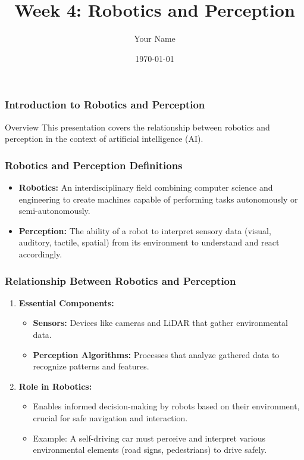 \documentclass{beamer}
\title{Week 4: Robotics and Perception}
\author{Your Name}
\institute{Your Institution}
\date{\today}
\begin{document}
\frame{\titlepage}

\begin{frame}[fragile]
    \frametitle{Introduction to Robotics and Perception}
    \begin{block}{Overview}
        This presentation covers the relationship between robotics and perception in the context of artificial intelligence (AI).
    \end{block}
\end{frame}

\begin{frame}[fragile]
    \frametitle{Robotics and Perception Definitions}
    \begin{itemize}
        \item \textbf{Robotics:} 
        An interdisciplinary field combining computer science and engineering to create machines capable of performing tasks autonomously or semi-autonomously.
        \item \textbf{Perception:} 
        The ability of a robot to interpret sensory data (visual, auditory, tactile, spatial) from its environment to understand and react accordingly.
    \end{itemize}
\end{frame}

\begin{frame}[fragile]
    \frametitle{Relationship Between Robotics and Perception}
    \begin{enumerate}
        \item \textbf{Essential Components:}
        \begin{itemize}
            \item \textbf{Sensors:} 
            Devices like cameras and LiDAR that gather environmental data.
            \item \textbf{Perception Algorithms:} 
            Processes that analyze gathered data to recognize patterns and features.
        \end{itemize}
        
        \item \textbf{Role in Robotics:}
        \begin{itemize}
            \item Enables informed decision-making by robots based on their environment, crucial for safe navigation and interaction.
            \item Example: A self-driving car must perceive and interpret various environmental elements (road signs, pedestrians) to drive safely.
        \end{itemize}
    \end{enumerate}
\end{frame}
\end{document}
